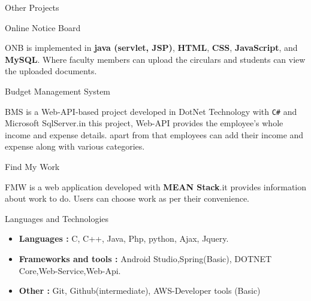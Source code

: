 \documentclass{resume} %
\begin{document}

\begin{rSection}{Other Projects}

\begin{rSubsection}{Online Notice Board}{}{}{}
\item ONB is implemented in \textbf{java (servlet, JSP)}, \textbf{HTML}, \textbf{CSS}, \textbf{JavaScript}, and \textbf{MySQL}. Where faculty members can upload the circulars and students can view the uploaded documents.
\end{rSubsection}


\begin{rSubsection}{Budget Management System}{}{}{}
\item BMS is a Web-API-based project developed in DotNet Technology with \texttt{C\#} and Microsoft SqlServer.in this project, Web-API provides the employee’s whole income and expense details. apart from that employees can add their income and expense along with various categories. 
\end{rSubsection}


\begin{rSubsection}{Find My Work}{}{}{}
\item FMW is a web application developed with \textbf{MEAN Stack}.it provides information about work to do. Users can choose work as per their convenience. 
\end{rSubsection}


\end{rSection}






\begin{rSection}{Languages  and Technologies}
\begin{itemize}
\item \textbf{Languages :} C, C++, Java, Php, python, Ajax, Jquery.
\item \textbf{Frameworks and tools :} Android Studio,Spring(Basic), DOTNET Core,Web-Service,Web-Api.
\item \textbf{Other : }Git, Github(intermediate), AWS-Developer tools (Basic)
\end{itemize}
\end{rSection}
\end{document}
